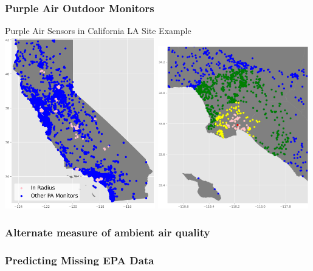 \documentclass{beamer}
\begin{document}
\begin{frame}
\frametitle{Purple Air Outdoor Monitors}
\hspace{1em}
Purple Air Sensors in California 
\hspace{4em}
LA Site Example \\

\includegraphics[width=0.49\textwidth]{output/figures/pa/all_ca_and_15_pa_monitors.png}
\includegraphics[width=0.49\textwidth]{output/figures/concentric_ranges/county-037_site-4004_epa-pa-concentric-ranges.png}
\end{frame}


\begin{frame}
\frametitle{Alternate measure of ambient air quality}
\end{frame}


\begin{frame}
\frametitle{Predicting Missing EPA Data}
\end{frame}
\end{document}
